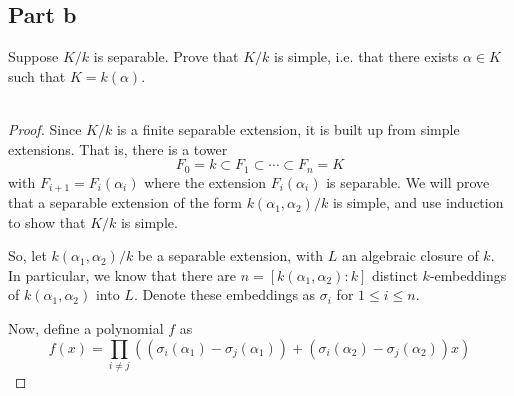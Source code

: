 \documentclass[12pt,reqno]{amsart}
\begin{document}
\subsection*{Part b}
Suppose $K/k$ is separable. Prove that $K/k$ is simple, i.e. that there exists
$\alpha\in K$ such that $K=k(\alpha)$.
\\
\\
\begin{proof}
    Since $K/k$ is a finite separable extension, it is built up from simple
    extensions.  That is, there is a tower
    \[
        F_0 = k \subset F_1\subset \cdots \subset F_n = K
    \]
    with $F_{i+1} = F_i(\alpha_i)$ where the extension $F_i(\alpha_i)$ is
    separable. We will prove that a separable extension of the form
    $k(\alpha_1,\alpha_2)/k$ is simple, and use induction to show that $K/k$ is
    simple.

    So, let $k(\alpha_1,\alpha_2)/k$ be a separable extension, with $L$ an
    algebraic closure of $k$. In particular, we know that there are
    $n=[k(\alpha_1,\alpha_2):k]$ distinct $k$-embeddings of
    $k(\alpha_1,\alpha_2)$ into $L$. Denote these embeddings as $\sigma_i$ for
    $1\leq i\leq n$.

    Now, define a polynomial $f$ as
    \[
        f(x) = \prod_{i\neq j}((\sigma_i(\alpha_1) - \sigma_j(\alpha_1)) +
        (\sigma_i(\alpha_2) -\sigma_j(\alpha_2))x)
    \]


\end{proof}
\end{document}
